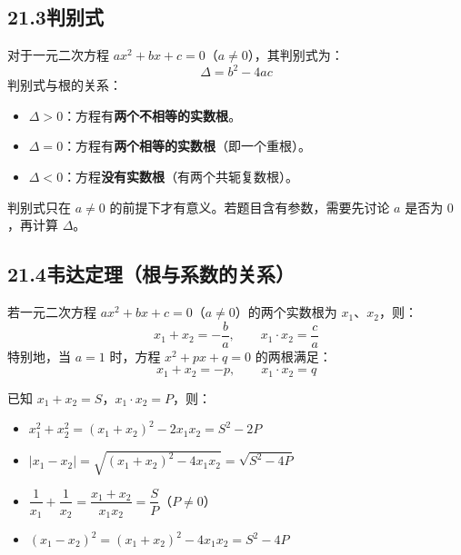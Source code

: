 \documentclass[12pt, a4paper]{ctexart}
\begin{document}
\subsection*{21.3\quad 判别式}

\begin{knowledgebox}
对于一元二次方程 $ax^2+bx+c=0$（$a \neq 0$），其判别式为：
\[
\boxed{\Delta = b^2 - 4ac}
\]
判别式与根的关系：
\begin{itemize}[leftmargin=*]
  \item $\Delta > 0$：方程有\textbf{两个不相等的实数根}。
  \item $\Delta = 0$：方程有\textbf{两个相等的实数根}（即一个重根）。
  \item $\Delta < 0$：方程\textbf{没有实数根}（有两个共轭复数根）。
\end{itemize}
\end{knowledgebox}

\begin{warnbox}[易错提醒]
判别式只在 $a \neq 0$ 的前提下才有意义。若题目含有参数，需要先讨论 $a$ 是否为 $0$，再计算 $\Delta$。
\end{warnbox}

\subsection*{21.4\quad 韦达定理（根与系数的关系）}

\begin{knowledgebox}[韦达定理]
若一元二次方程 $ax^2+bx+c=0$（$a\neq 0$）的两个实数根为 $x_1$、$x_2$，则：
\[
\boxed{x_1 + x_2 = -\frac{b}{a}, \qquad x_1 \cdot x_2 = \frac{c}{a}}
\]
特别地，当 $a=1$ 时，方程 $x^2+px+q=0$ 的两根满足：
\[
x_1 + x_2 = -p, \qquad x_1 \cdot x_2 = q
\]
\end{knowledgebox}

\begin{tipbox}[韦达定理的常见变形]
已知 $x_1+x_2 = S$，$x_1 \cdot x_2 = P$，则：
\begin{itemize}[leftmargin=*]
  \item $x_1^2 + x_2^2 = (x_1+x_2)^2 - 2x_1 x_2 = S^2 - 2P$
  \item $|x_1 - x_2| = \sqrt{(x_1+x_2)^2 - 4x_1 x_2} = \sqrt{S^2 - 4P}$
  \item $\dfrac{1}{x_1} + \dfrac{1}{x_2} = \dfrac{x_1+x_2}{x_1 x_2} = \dfrac{S}{P}$\quad（$P \neq 0$）
  \item $(x_1-x_2)^2 = (x_1+x_2)^2 - 4x_1 x_2 = S^2 - 4P$
\end{itemize}
\end{tipbox}
\end{document}
